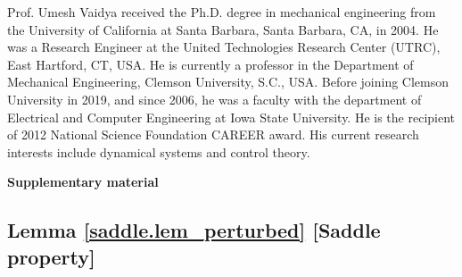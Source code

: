 \documentclass[journal,twoside,web]{ieeecolor}
\begin{document}
\begin{IEEEbiography}
{Prof. Umesh Vaidya} received the Ph.D. degree in mechanical engineering from the University of California at Santa Barbara, Santa Barbara, CA, in
2004. He was a Research Engineer at the United Technologies Research Center (UTRC), East Hartford, CT, USA. He is currently a professor in the Department of Mechanical Engineering, Clemson University, S.C., USA. Before joining Clemson University in 2019, and since 2006, he was a faculty with the department of Electrical and Computer Engineering at Iowa State University. He is the recipient of 2012 National Science Foundation CAREER award. His current research interests include dynamical systems and control theory.
\end{IEEEbiography}

\iffalse
\begin{center}
    \onecolumn
    \Large \bf{Supplementary material}
\end{center}
\subsection{Lemma \ref{saddle.lem_perturbed} [Saddle property]}
\end{document}
